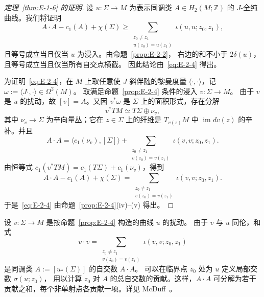 \begin{proof}[定理~\ref{thm:E-1-6} 的证明]
设 $u:\Sigma\to M$ 为表示同调类 $A\in H_2(M;\mathbb Z)$ 的
$J$-全纯曲线。我们将证明
\begin{equation}\label{eq:E-2-4}
  A\cdot A-c_1(A)+\chi(\Sigma)
  \ge\sum_{\substack{z_0\ne z_1\\u(z_0)=u(z_1)}}
    \iota(u,u;z_0,z_1),
\end{equation}
且等号成立当且仅当 $u$ 为浸入。由命题~\ref{prop:E-2-2}，
右边的和不小于 $2\delta(u)$，且等号成立当且仅当所有自交点横截。
因此结论由~\eqref{eq:E-2-4} 得出。

为证明~\eqref{eq:E-2-4}，在 $M$ 上取任意使 $J$ 斜伴随的黎曼度量
$\langle\cdot,\cdot\rangle$，记
$\omega:=\langle J\cdot,\cdot\rangle\in\Omega^2(M)$。
取满足命题~\ref{prop:E-2-4} 条件的浸入 $v:\Sigma\to M$。
由于 $v$ 是 $u$ 的扰动，故 $[v]=A$。又因 $v^*\omega$ 是 $\Sigma$
上的面积形式，存在分解
\[
  v^*TM\simeq T\Sigma\oplus\nu_v,
\]
其中 $\nu_v\to\Sigma$ 为辛向量丛；它在 $z\in\Sigma$ 上的纤维是
$T_{v(z)}M$ 中 $\operatorname{im}dv(z)$ 的辛补。并且
\[
  A\cdot A=\langle c_1(\nu_v),[\Sigma]\rangle
    +\sum_{\substack{z_0\ne z_1\\v(z_0)=v(z_1)}}
      \iota(v,v;z_0,z_1).
\]
由恒等式 $c_1(v^*TM)=c_1(T\Sigma)+c_1(\nu_v)$，得到
\[
  A\cdot A-c_1(A)+\chi(\Sigma)
  =\sum_{\substack{z_0\ne z_1\\v(z_0)=v(z_1)}}
    \iota(v,v;z_0,z_1).
\]
于是~\eqref{eq:E-2-4} 由命题~\ref{prop:E-2-4}(iv)--(v) 得出。
\end{proof}

\begin{remark}\label{rem:E-2-5}
设 $v:\Sigma\to M$ 是按命题~\ref{prop:E-2-4} 构造的曲线 $u$ 的扰动。
由于 $v$ 与 $u$ 同伦，和式
\[
  v\cdot v
  =\sum_{\substack{z_0\ne z_1\\v(z_0)=v(z_1)}}
    \iota(v,v;z_0,z_1)
\]
是同调类 $A:=[u_*(\Sigma)]$ 的自交数 $A\cdot A$。
可以在临界点 $z_0$ 处为 $u$ 定义局部交数 $\sigma(u;z_0)$，
用以计算 $z_0$ 对 $A$ 的总自交数的贡献。这样，$A\cdot A$ 可分解为若干
贡献之和，每个非单射点各贡献一项。详见 McDuff~。
\end{remark}

